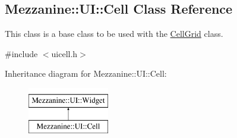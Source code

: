 \hypertarget{classMezzanine_1_1UI_1_1Cell}{
\subsection{Mezzanine::UI::Cell Class Reference}
\label{classMezzanine_1_1UI_1_1Cell}
}


This class is a base class to be used with the \hyperlink{classMezzanine_1_1UI_1_1CellGrid}{CellGrid} class.  




{\ttfamily \#include $<$uicell.h$>$}

Inheritance diagram for Mezzanine::UI::Cell:\begin{figure}[H]
\begin{center}
\leavevmode
\includegraphics[height=2.000000cm]{classMezzanine_1_1UI_1_1Cell}
\end{center}
\end{figure}
